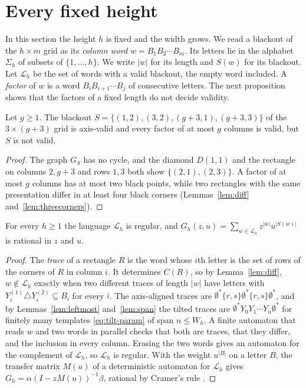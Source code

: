 \section{Every fixed height}\label{sec:height}

In this section the height $h$ is fixed and the width grows. We read a blackout of the $h\times m$ grid as its \emph{column word} $w=B_1B_2\cdots B_m$. Its letters lie in the alphabet $\Sigma_h$ of subsets of $\{1,\dots,h\}$. We write $|w|$ for its length and $S(w)$ for its blackout. Let $\mathcal L_h$ be the set of words with a valid blackout, the empty word included. A \emph{factor} of $w$ is a word $B_iB_{i+1}\cdots B_j$ of consecutive letters. The next proposition shows that the factors of a fixed length do not decide validity.

\begin{proposition}\label{prop:nonlocal}
Let $g\ge1$. The blackout $S=\{(1,2),(3,2),(g+3,1),(g+3,3)\}$ of the $3\times(g+3)$ grid is axis-valid and every factor of at most $g$ columns is valid, but $S$ is not valid.
\end{proposition}

\begin{proof}
The graph $G_S$ has no cycle, and the diamond $D(1,1)$ and the rectangle on columns $2,g+3$ and rows $1,3$ both show $\{(2,1),(2,3)\}$. A factor of at most $g$ columns has at most two black points, while two rectangles with the same presentation differ in at least four black corners (Lemmas~\ref{lem:diff} and~\ref{lem:threecorners}).
\end{proof}

\begin{theorem}\label{thm:regular}
For every $h\ge1$ the language $\mathcal L_h$ is regular, and $G_h(z,u)=\sum_{w\in\mathcal L_h}z^{|w|}u^{|S(w)|}$ is rational in $z$ and $u$.
\end{theorem}

\begin{proof}
The \emph{trace} of a rectangle $R$ is the word whose $i$th letter is the set of rows of the corners of $R$ in column $i$. It determines $C(R)$, so by Lemma~\ref{lem:diff}, $w\notin\mathcal L_h$ exactly when two different traces of length $|w|$ have letters with $Y^{(1)}_i\triangle Y^{(2)}_i\subseteq B_i$ for every $i$. The axis-aligned traces are $\emptyset^*\{r,s\}\emptyset^*\{r,s\}\emptyset^*$, and by Lemmas~\ref{lem:leftmost} and~\ref{lem:span} the tilted traces are $\emptyset^*Y_0Y_1\cdots Y_n\emptyset^*$ for finitely many templates \eqref{eq:tilt-param} of span $n\le W_h$. A finite automaton that reads $w$ and two words in parallel checks that both are traces, that they differ, and the inclusion in every column. Erasing the two words gives an automaton for the complement of $\mathcal L_h$, so $\mathcal L_h$ is regular. With the weight $u^{|B|}$ on a letter $B$, the transfer matrix $M(u)$ of a deterministic automaton for $\mathcal L_h$ gives $G_h=\alpha(I-zM(u))^{-1}\beta$, rational by Cramer's rule \cite[Proposition~I.3]{flajolet2009}.
\end{proof}


